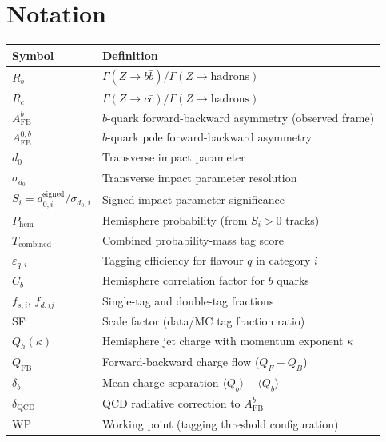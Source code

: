 \documentclass[11pt,a4paper]{article}
\begin{document}
\section*{Notation}

\begin{table}[htbp]
\centering
\begin{tabular}{ll}
\toprule
Symbol & Definition \\
\midrule
$R_b$ & $\Gamma(Z \to b\bar{b}) / \Gamma(Z \to \mathrm{hadrons})$ \\
$R_c$ & $\Gamma(Z \to c\bar{c}) / \Gamma(Z \to \mathrm{hadrons})$ \\
$A_\mathrm{FB}^b$ & $b$-quark forward-backward asymmetry (observed frame) \\
$A_\mathrm{FB}^{0,b}$ & $b$-quark pole forward-backward asymmetry \\
$d_0$ & Transverse impact parameter \\
$\sigma_{d_0}$ & Transverse impact parameter resolution \\
$S_i = d_{0,i}^\mathrm{signed}/\sigma_{d_0,i}$ & Signed impact parameter significance \\
$P_\mathrm{hem}$ & Hemisphere probability (from $S_i > 0$ tracks) \\
$T_\mathrm{combined}$ & Combined probability-mass tag score \\
$\varepsilon_{q,i}$ & Tagging efficiency for flavour $q$ in category $i$ \\
$C_b$ & Hemisphere correlation factor for $b$ quarks \\
$f_{s,i}$, $f_{d,ij}$ & Single-tag and double-tag fractions \\
SF & Scale factor (data/MC tag fraction ratio) \\
$Q_h(\kappa)$ & Hemisphere jet charge with momentum exponent $\kappa$ \\
$Q_\mathrm{FB}$ & Forward-backward charge flow ($Q_F - Q_B$) \\
$\delta_b$ & Mean charge separation $\langle Q_b \rangle - \langle Q_{\bar{b}} \rangle$ \\
$\delta_\mathrm{QCD}$ & QCD radiative correction to $A_\mathrm{FB}^b$ \\
WP & Working point (tagging threshold configuration) \\
\bottomrule
\end{tabular}
\end{table}
\end{document}
